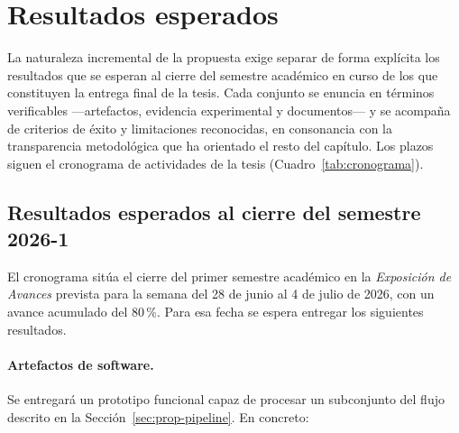 \section{Resultados esperados}
\label{sec:prop-resultados-esperados}

La naturaleza incremental de la propuesta exige separar de forma explícita los resultados que se esperan al cierre del semestre académico en curso de los que constituyen la entrega final de la tesis. Cada conjunto se enuncia en términos verificables ---artefactos, evidencia experimental y documentos--- y se acompaña de criterios de éxito y limitaciones reconocidas, en consonancia con la transparencia metodológica que ha orientado el resto del capítulo. Los plazos siguen el cronograma de actividades de la tesis (Cuadro~\ref{tab:cronograma}).

\subsection{Resultados esperados al cierre del semestre 2026-1}
\label{subsec:prop-resultados-sem1}

El cronograma sitúa el cierre del primer semestre académico en la \emph{Exposición de Avances} prevista para la semana del 28 de junio al 4 de julio de 2026, con un avance acumulado del 80\,\%. Para esa fecha se espera entregar los siguientes resultados.

\paragraph{Artefactos de software.} Se entregará un prototipo funcional capaz de procesar un subconjunto del flujo descrito en la Sección~\ref{sec:prop-pipeline}. En concreto:


